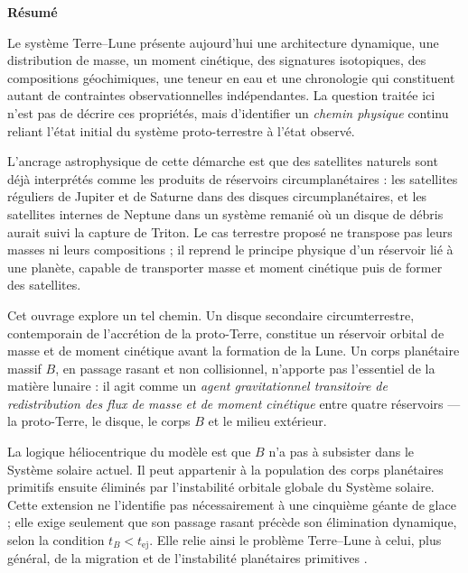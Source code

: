 \documentclass[11pt,a4paper,openany]{report}
\begin{document}
\thispagestyle{plain}
\begin{center}{\Large\bfseries Résumé}\end{center}
\medskip

Le système Terre--Lune présente aujourd'hui une architecture dynamique, une distribution de
masse, un moment cinétique, des signatures isotopiques, des compositions géochimiques, une
teneur en eau et une chronologie qui constituent autant de contraintes observationnelles
indépendantes. La question traitée ici n'est pas de décrire ces propriétés, mais d'identifier un
\emph{chemin physique} continu reliant l'état initial du système proto-terrestre à l'état observé.

L'ancrage astrophysique de cette démarche est que des satellites naturels sont déjà interprétés
comme les produits de réservoirs circumplanétaires : les satellites réguliers de Jupiter et de
Saturne dans des disques circumplanétaires, et les satellites internes de Neptune dans un système
remanié où un disque de débris aurait suivi la capture de Triton. Le cas terrestre proposé ne
transpose pas leurs masses ni leurs compositions ; il reprend le principe physique d'un réservoir
lié à une planète, capable de transporter masse et moment cinétique puis de former des satellites.

Cet ouvrage explore un tel chemin. Un disque secondaire circumterrestre, contemporain de
l'accrétion de la proto-Terre, constitue un réservoir orbital de masse et de moment cinétique
avant la formation de la Lune. Un corps planétaire massif $B$, en passage rasant et non
collisionnel, n'apporte pas l'essentiel de la matière lunaire : il agit comme un \emph{agent
gravitationnel transitoire de redistribution des flux de masse et de moment cinétique} entre
quatre réservoirs --- la proto-Terre, le disque, le corps $B$ et le milieu extérieur.

La logique héliocentrique du modèle est que $B$ n'a pas à subsister dans le Système solaire
actuel. Il peut appartenir à la population des corps planétaires primitifs ensuite éliminés par
l'instabilité orbitale globale du Système solaire. Cette extension ne l'identifie pas nécessairement
à une cinquième géante de glace ; elle exige seulement que son passage rasant précède son
élimination dynamique, selon la condition $t_B<t_{\mathrm{ej}}$. Elle relie ainsi le problème
Terre--Lune à celui, plus général, de la migration et de l'instabilité planétaires primitives
\cite{Tsiganis2005,Gomes2005,Nesvorny2011,NesvornyMorbidelli2012,Liu2022,Clement2018}.
\end{document}
